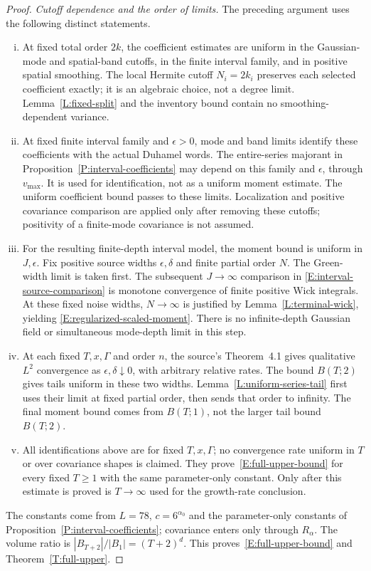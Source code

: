 \documentclass[12pt]{article}
\numberwithin{equation}{section}
\theoremstyle{definition}
\begin{document}
\begin{proof}
  \emph{Cutoff dependence and the order of limits.}
  The preceding argument uses the following distinct statements.
  \begin{enumerate}[(i)]
    \item At fixed total order $2k$, the coefficient estimates are uniform
      in the Gaussian-mode and spatial-band cutoffs, in the finite interval
      family, and in positive spatial smoothing. The local Hermite cutoff
      $N_i=2k_i$ preserves each selected coefficient exactly; it is an
      algebraic choice, not a degree limit. Lemma~\ref{L:fixed-split} and
      the inventory bound contain no smoothing-dependent variance.
    \item At fixed finite interval family and $\epsilon>0$, mode and band
      limits identify these coefficients with the actual Duhamel words.
      The entire-series majorant in Proposition~\ref{P:interval-coefficients}
      may depend on this family and $\epsilon$, through $v_{\max}$.
      It is used for identification, not as a uniform moment estimate.
      The uniform coefficient bound passes to these limits. Localization
      and positive covariance comparison are applied only after removing
      these cutoffs; positivity of a finite-mode covariance is not assumed.
    \item For the resulting finite-depth interval model, the moment bound
      is uniform in $J,\epsilon$. Fix positive source widths
      $\epsilon,\delta$ and finite partial order $N$. The Green-width limit
      is taken first. The subsequent $J\to\infty$ comparison in
      \eqref{E:interval-source-comparison} is monotone convergence of finite
      positive Wick integrals. At these fixed noise widths,
      $N\to\infty$ is justified by Lemma~\ref{L:terminal-wick}, yielding
      \eqref{E:regularized-scaled-moment}. There is no infinite-depth
      Gaussian field or simultaneous mode-depth limit in this step.
    \item At each fixed $T,x,\Gamma$ and order $n$, the source's
      Theorem~4.1 gives qualitative $L^2$ convergence as
      $\epsilon,\delta\downarrow0$, with arbitrary relative rates.
      The bound $B(T;2)$ gives tails uniform in these two widths.
      Lemma~\ref{L:uniform-series-tail} first uses their limit at fixed
      partial order, then sends that order to infinity. The final moment
      bound comes from $B(T;1)$, not the larger tail bound $B(T;2)$.
    \item All identifications above are for fixed $T,x,\Gamma$; no
      convergence rate uniform in $T$ or over covariance shapes is claimed.
      They prove~\eqref{E:full-upper-bound} for every fixed $T\ge1$ with
      the same parameter-only constant. Only after this estimate is proved
      is $T\to\infty$ used for the growth-rate conclusion.
  \end{enumerate}
  The constants come from $L=78$, $c=6^{\alpha_0}$ and the parameter-only
  constants of Proposition~\ref{P:interval-coefficients}; covariance enters
  only through $R_\alpha$.
  The volume ratio is $|B_{T+2}|/|B_1|=(T+2)^d$.
  This proves~\eqref{E:full-upper-bound} and
  Theorem~\ref{T:full-upper}.
\end{proof}
\end{document}
